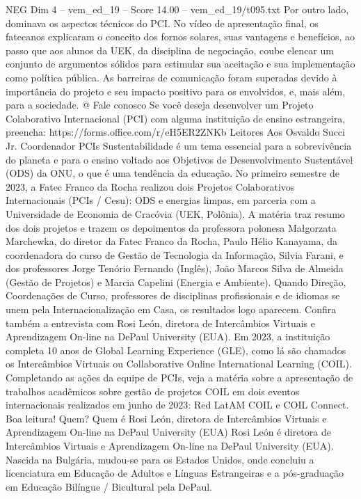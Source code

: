 \begin{textsample}{NEG Dim 4 – vem\_ed\_19 – Score 14.00 – vem\_ed\_19/t095.txt}
Por outro lado, dominava os aspectos técnicos do PCI.
No vídeo de apresentação final, os fatecanos explicaram o conceito dos fornos solares, suas vantagens e benefícios, ao passo que aos alunos da UEK, da disciplina de negociação, coube elencar um conjunto de argumentos sólidos para estimular sua aceitação e sua implementação como política pública.
As barreiras de comunicação foram superadas devido à importância do projeto e seu impacto positivo para os envolvidos, e, mais além, para a sociedade. @ Fale conosco Se você deseja desenvolver um Projeto Colaborativo Internacional (PCI) com alguma instituição de ensino estrangeira, preencha: https://forms.office.com/r/eH5ER2ZNKb Leitores Aos Osvaldo Succi Jr.
Coordenador PCIs Sustentabilidade é um tema essencial para a sobrevivência do planeta e para o ensino voltado aos Objetivos de Desenvolvimento Sustentável (ODS) da ONU, o que é uma tendência da educação.
No primeiro semestre de 2023, a Fatec Franco da Rocha realizou dois Projetos Colaborativos Internacionais (PCIs / Cesu): ODS e energias limpas, em parceria com a Universidade de Economia de Cracóvia (UEK, Polônia).
A matéria traz resumo dos dois projetos e trazem os depoimentos da professora polonesa Małgorzata Marchewka, do diretor da Fatec Franco da Rocha, Paulo Hélio Kanayama, da coordenadora do curso de Gestão de Tecnologia da Informação, Silvia Farani, e dos professores Jorge Tenório Fernando (Inglês), João Marcos Silva de Almeida (Gestão de Projetos) e Marcia Capelini (Energia e Ambiente).
Quando Direção, Coordenações de Curso, professores de disciplinas profissionais e de idiomas se unem pela Internacionalização em Casa, os resultados logo aparecem.
Confira também a entrevista com Rosi León, diretora de Intercâmbios Virtuais e Aprendizagem On-line na DePaul University (EUA).
Em 2023, a instituição completa 10 anos de Global Learning Experience (GLE), como lá são chamados os Intercâmbios Virtuais ou Collaborative Online International Learning (COIL).
Completando as ações da equipe de PCIs, veja a matéria sobre a apresentação de trabalhos acadêmicos sobre gestão de projetos COIL em dois eventos internacionais realizados em junho de 2023: Red LatAM COIL e COIL Connect.
Boa leitura!
Quem?
Quem é Rosi León, diretora de Intercâmbios Virtuais e Aprendizagem On-line na DePaul University (EUA) Rosi León é diretora de Intercâmbios Virtuais e Aprendizagem On-line na DePaul University (EUA).
Nascida na Bulgária, mudou-se para os Estados Unidos, onde concluiu a licenciatura em Educação de Adultos e Línguas Estrangeiras e a pós-graduação em Educação Bilíngue / Bicultural pela DePaul.

\end{textsample}

